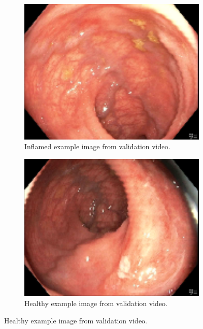 \begin{figure}[H]
	\centering
	\begin{subfigure}{0.4\linewidth}
		\centering
		\includegraphics[width=\linewidth]{Materials/Results/Intro/idx_1_frame_830}
		\caption{Inflamed example image from validation video.}
	\end{subfigure}
	\hspace{0.5cm}
	\begin{subfigure}{0.4\linewidth}
		\centering
		\includegraphics[width=\linewidth]{Materials/Results/Intro/idx_1_frame_1210}
		\caption{Healthy example image from validation video.\newline}

\end{subfigure}
\end{figure}
